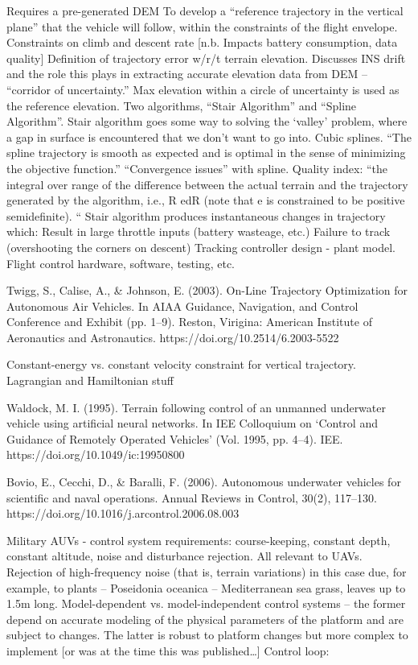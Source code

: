 Requires a pre-generated DEM
To develop a “reference trajectory in the vertical plane” that the vehicle will follow, within the constraints of the flight envelope.
Constraints on climb and descent rate [n.b. Impacts battery consumption, data quality]
Definition of trajectory error w/r/t terrain elevation.
Discusses INS drift and the role this plays in extracting accurate elevation data from DEM -- “corridor of uncertainty.”
Max elevation within a circle of uncertainty is used as the reference elevation.
Two algorithms, “Stair Algorithm” and “Spline Algorithm”.
Stair algorithm goes some way to solving the ‘valley’ problem, where a gap in surface is encountered that we don’t want to go into.
Cubic splines.
“The spline trajectory is smooth as expected and is optimal in the sense of minimizing the objective function.”
“Convergence issues” with spline.
Quality index: “the integral over range of the difference between the actual terrain and the trajectory generated by the algorithm, i.e., R edR (note that e is constrained to be positive semidefinite). “
Stair algorithm produces instantaneous changes in trajectory which:
Result in large throttle inputs (battery wasteage, etc.)
Failure to track (overshooting the corners on descent)
Tracking controller design - plant model.
Flight control hardware, software, testing, etc.

\cite{Twigg2003}
Twigg, S., Calise, A., \& Johnson, E. (2003). On-Line Trajectory Optimization for Autonomous Air Vehicles. In AIAA Guidance, Navigation, and Control Conference and Exhibit (pp. 1–9). Reston, Virigina: American Institute of Aeronautics and Astronautics. https://doi.org/10.2514/6.2003-5522

Constant-energy vs. constant velocity constraint for vertical trajectory.
Lagrangian and Hamiltonian stuff

\cite{Waldock1995}
Waldock, M. I. (1995). Terrain following control of an unmanned underwater vehicle using artificial neural networks. In IEE Colloquium on `Control and Guidance of Remotely Operated Vehicles’ (Vol. 1995, pp. 4–4). IEE. https://doi.org/10.1049/ic:19950800

\cite{Bovio2006}
Bovio, E., Cecchi, D., \& Baralli, F. (2006). Autonomous underwater vehicles for scientific and naval operations. Annual Reviews in Control, 30(2), 117–130. https://doi.org/10.1016/j.arcontrol.2006.08.003

Military AUVs - control system requirements: course-keeping, constant depth, constant altitude, noise and disturbance rejection. All relevant to UAVs.
Rejection of high-frequency noise (that is, terrain variations) in this case due, for example, to plants -- Poseidonia oceanica -- Mediterranean sea grass, leaves up to 1.5m long.
Model-dependent vs. model-independent control systems -- the former depend on accurate modeling of the physical parameters of the platform and are subject to changes. The latter is robust to platform changes but more complex to implement [or was at the time this was published…]
Control loop:

